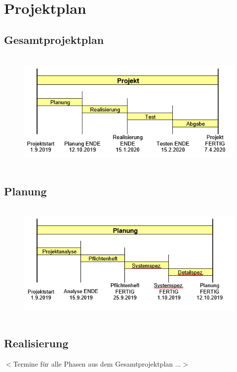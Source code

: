 	
	\chapter{Projektplan}
	\section{Gesamtprojektplan}
	\begin{figure}[ht]
			\includegraphics[height=6cm]{Images/Latex1.png}
	\end{figure}
	\label{Abbildung1}
	
	\section{Planung}
	\begin{figure}[ht]
		\includegraphics[height=6cm]{Images/Latex2.png}
	\end{figure}
	\label{Abbildung2}
	
	\section{Realisierung}
	$<$Termine für alle Phasen aus dem Gesamtprojektplan ...$>$